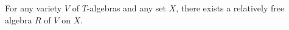For any variety $V$ of $T$-algebras and any set $X$, there exists a relatively free algebra $R$ of $V$ on $X$.
